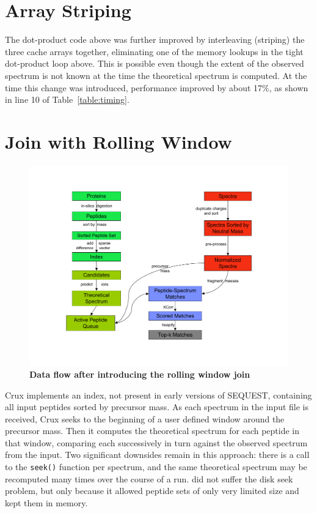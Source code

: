 \section{Array Striping \label{subsubsection:striping}}

The dot-product code above was further improved by interleaving (striping) the
three cache arrays together, eliminating one of the memory lookups in the tight
dot-product loop above. This is possible even though the extent of the observed
spectrum is not known at the time the theoretical spectrum is computed. At the
time this change was introduced, performance improved by about 17\%, as shown in
line 10 of Table~\ref{table:timing}.

\section{Join with Rolling Window \label{subsubsection:join}}

\begin{figure}
\centering
\includegraphics[width=6.0in]{Diagrams_p2-p2-cropped.pdf}
\caption{{\bf Data flow after introducing the rolling window join}
  \label{figure:join}}
\end{figure}

Crux implements an index, not present in early versions of SEQUEST,
containing all input peptides sorted by precursor mass. As each
spectrum in the input file is received, Crux seeks to the beginning of
a user defined window around the precursor mass. Then it computes the
theoretical spectrum for each peptide in that window, comparing each
successively in turn against the observed spectrum from the input. Two
significant downsides remain in this approach: there is a call to the
{\tt seek()} function 
per spectrum, and the same theoretical spectrum may be recomputed many
times over the course of a run. \tidezero did not suffer the disk seek
problem, but only because it allowed peptide sets of only very limited
size and kept them in memory.

